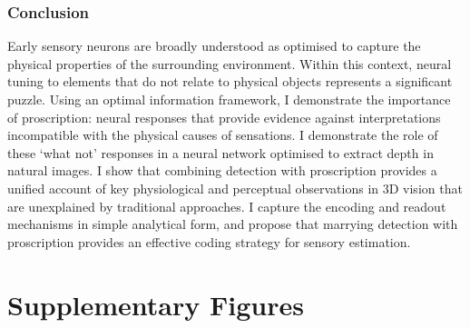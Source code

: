 \subsubsection*{Conclusion}

Early sensory neurons are broadly understood as optimised to capture the physical properties of the surrounding environment. Within this context, neural tuning to elements that do not relate to physical objects represents a significant puzzle. Using an optimal information framework, I demonstrate the importance of proscription: neural responses that provide evidence against interpretations incompatible with the physical causes of sensations. I demonstrate the role of these `what not' responses in a neural network optimised to extract depth in natural images. I show that combining detection with proscription provides a unified account of key physiological and perceptual observations in 3D vision that are unexplained by traditional approaches. I capture the encoding and readout mechanisms in simple analytical form, and propose that marrying detection with proscription provides an effective coding strategy for sensory estimation.

\clearpage

\section{Supplementary Figures}

